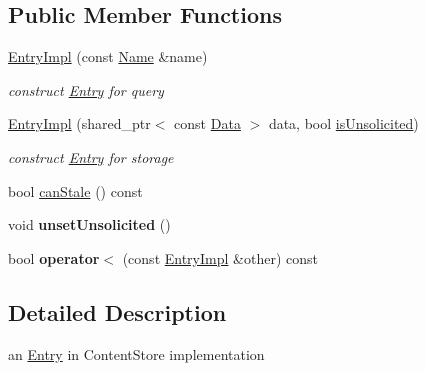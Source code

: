 \subsection*{Public Member Functions}
\begin{DoxyCompactItemize}
\item 
\hyperlink{classnfd_1_1cs_1_1EntryImpl_a0861113c3a3c3ab9eafa41eb45acb292}{Entry\+Impl} (const \hyperlink{classndn_1_1Name}{Name} \&name)
\begin{DoxyCompactList}\small\item\em construct \hyperlink{classnfd_1_1cs_1_1Entry}{Entry} for query \end{DoxyCompactList}\item 
\hyperlink{classnfd_1_1cs_1_1EntryImpl_a514cc1004fb06d52fad3163d84c46855}{Entry\+Impl} (shared\+\_\+ptr$<$ const \hyperlink{classndn_1_1Data}{Data} $>$ data, bool \hyperlink{classnfd_1_1cs_1_1Entry_ae2decf9b1c986c0d894968fe633ee95f}{is\+Unsolicited})\hypertarget{classnfd_1_1cs_1_1EntryImpl_a514cc1004fb06d52fad3163d84c46855}{}\label{classnfd_1_1cs_1_1EntryImpl_a514cc1004fb06d52fad3163d84c46855}

\begin{DoxyCompactList}\small\item\em construct \hyperlink{classnfd_1_1cs_1_1Entry}{Entry} for storage \end{DoxyCompactList}\item 
bool \hyperlink{classnfd_1_1cs_1_1EntryImpl_a7f3a81713cbe3d7b1f7c2d42fb4c9f3f}{can\+Stale} () const
\item 
void {\bfseries unset\+Unsolicited} ()\hypertarget{classnfd_1_1cs_1_1EntryImpl_a687d5947eb025a71deca538b3ab2a292}{}\label{classnfd_1_1cs_1_1EntryImpl_a687d5947eb025a71deca538b3ab2a292}

\item 
bool {\bfseries operator$<$} (const \hyperlink{classnfd_1_1cs_1_1EntryImpl}{Entry\+Impl} \&other) const\hypertarget{classnfd_1_1cs_1_1EntryImpl_a41128e6bf8a2037c8ea87d05a8e77ca8}{}\label{classnfd_1_1cs_1_1EntryImpl_a41128e6bf8a2037c8ea87d05a8e77ca8}

\end{DoxyCompactItemize}


\subsection{Detailed Description}
an \hyperlink{classnfd_1_1cs_1_1Entry}{Entry} in Content\+Store implementation 


